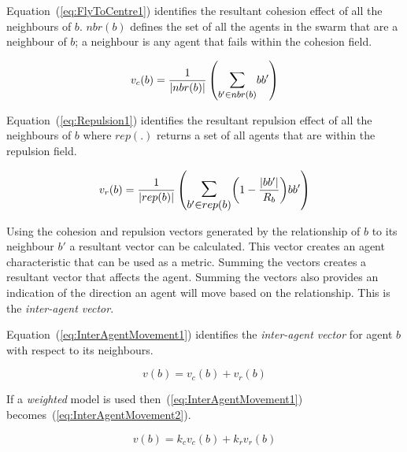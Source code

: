 \documentclass{ieeeaccess}
\begin{document}

Equation~(\ref{eq:FlyToCentre1}) identifies the resultant cohesion effect of all the neighbours of $b$. $nbr(b)$ defines the set of all the agents in the swarm that are a neighbour of $b$; a neighbour is any agent that fails within the cohesion field.

\begin{equation}\label{eq:FlyToCentre1}
v_{c}(b) = \frac{1}{|nbr(b)|}\left({\mathlarger{\sum_{b' \in nbr(b)}}{bb'}}\right)
\end{equation}

Equation~(\ref{eq:Repulsion1}) identifies the resultant repulsion effect of all the neighbours of $b$ where $rep(.)$ returns a set of all agents that are within the repulsion field.

\begin{equation}
\label{eq:Repulsion1}
v_{r}(b) = 
\frac{1}{|rep(b)|}
\left(
\mathlarger{\mathlarger{\sum_{b' \in rep(b)}}}
{\left( 1-\frac{|bb'|}{R_b} \right)}
{bb'}
\right)
\end{equation}

Using the cohesion and repulsion vectors generated by the relationship of $b$ to its neighbour $b'$ a resultant vector can be calculated. This vector creates an agent characteristic that can be used as a metric. Summing the vectors creates a resultant vector that affects the agent. Summing the vectors also provides an indication of the direction an agent will move based on the relationship. This is the \emph{inter-agent vector}.

Equation~(\ref{eq:InterAgentMovement1}) identifies the \emph{inter-agent vector} for agent $b$ with respect to its neighbours.

\begin{equation}\label{eq:InterAgentMovement1}
v(b) = v_{c}(b) + v_{r}(b)
\end{equation}

If a \emph{weighted} model is used then~(\ref{eq:InterAgentMovement1}) becomes~(\ref{eq:InterAgentMovement2}).

\begin{equation}\label{eq:InterAgentMovement2}
v(b) = k_cv_{c}(b) + k_rv_{r}(b)
\end{equation}
\end{document}
